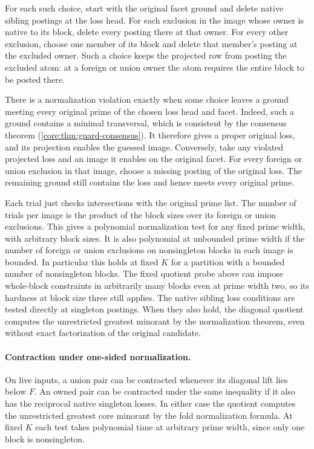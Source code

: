 For each such choice, start with the original facet
ground and delete native sibling postings at the loss
head. For each exclusion in the image whose owner is
native to its block, delete every posting there at
that owner. For every other exclusion, choose one
member of its block and delete that member's posting
at the excluded owner. Such a choice keeps the
projected row from posting the excluded atom: at a
foreign or union owner the atom requires the entire
block to be posted there.

There is a normalization violation exactly when some
choice leaves a ground meeting every original prime
of the chosen loss head and facet. Indeed, such a
ground contains a minimal transversal, which is
consistent by the consensus theorem
(\cref{core:thm:guard-consensus}). It therefore gives
a proper original loss, and its projection enables the
guessed image. Conversely, take any violated projected
loss and an image it enables on the original facet.
For every foreign or union exclusion in that image,
choose a missing posting of the original loss. The
remaining ground still contains the loss and hence
meets every original prime.

Each trial just checks intersections with the original
prime list. The number of trials per image is the
product of the block sizes over its foreign or union
exclusions. This gives a polynomial normalization
test for any fixed prime width, with arbitrary block
sizes. It is also polynomial at unbounded prime width
if the number of foreign or union exclusions on
nonsingleton blocks in each image is bounded. In
particular this holds at fixed $K$ for a partition with
a bounded number of nonsingleton blocks. The fixed
quotient probe above can impose whole-block constraints
in arbitrarily many blocks even at prime width two,
so its hardness at block size three still applies.
The native sibling loss conditions are tested
directly at singleton postings. When they also hold,
the diagonal quotient computes the unrestricted
greatest minorant by the normalization theorem,
even without exact factorization of the original
candidate.

\paragraph{Contraction under one-sided normalization.}
On live inputs, a union pair can be contracted whenever
its diagonal lift lies below $F$. An owned pair can be
contracted under the same inequality if it also has the
reciprocal native singleton losses. In either case the
quotient computes the unrestricted greatest core minorant
by the fold normalization formula. At fixed $K$ each test
takes polynomial time at arbitrary prime width, since only
one block is nonsingleton.

